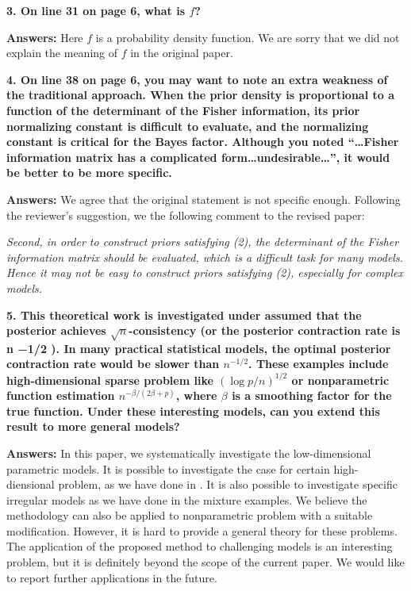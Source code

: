 \documentclass[11pt]{article}
\theoremstyle{plain}
\theoremstyle{definition}
\theoremstyle{remark}
\begin{document}
\textbf{
    3. On line 31 on page 6, what is $f$?
}

\textbf{Answers:}
Here $f$ is a probability density function.
We are sorry that we did not explain the meaning of $f$ in the original paper.

\textbf{
    4. On line 38 on page 6, you may want to note an extra weakness of the traditional approach.
    When the prior density is proportional to a function of the determinant of the Fisher information, its prior normalizing constant is difficult to evaluate, and the normalizing constant is critical for the Bayes factor.
    Although you noted ``\dots Fisher information matrix has a complicated form\dots undesirable\dots'', it would be better to be more specific.
}

\textbf{Answers:}
We agree that the original statement is not specific enough.
Following the reviewer's suggestion, we the following comment to the revised paper:
\begin{adjustwidth}{1.5em}{1.5em}
    \emph{
        Second, 
        in order to construct priors satisfying (2), the determinant of the Fisher information matrix should be evaluated, which is a difficult task for many models.
        Hence it may not be easy to construct priors satisfying (2), especially for complex models.
}
\end{adjustwidth}





\textbf{
    5. This theoretical work is investigated under assumed that the posterior achieves $\sqrt n$-consistency (or the posterior contraction rate is n −1/2 ).
    In many practical statistical models, the optimal posterior contraction rate would be slower than $n^{-1/2}$.
    These examples include high-dimensional sparse problem like $(\log p /n)^{1/2}$ or nonparametric function estimation $n^{-\beta / (2\beta + p)}$, where $\beta$ is a smoothing factor for the true function.
    Under these interesting models, can you extend this result to more general models?
}

\textbf{Answers:}
In this paper, we systematically investigate the low-dimensional parametric models.
It is possible to investigate the case for certain high-diensional problem, as we have done in \cite{Wang2020}.
It is also possible to investigate specific irregular models as we have done in the mixture examples.
We believe the methodology can also be applied to nonparametric problem with a suitable modification.
However, it is hard to provide a general theory for these problems.
The application of the proposed method to challenging models is an interesting problem, but it is definitely beyond the scope of the current paper.
We would like to report further applications in the future.
\end{document}
